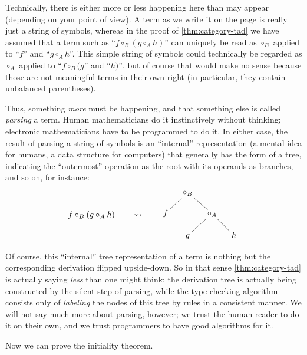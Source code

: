 \documentclass{book}
\def\comp#1{\circ_{#1}}
\begin{document}
\begin{rmk}
  Technically, there is either more or less happening here than may appear (depending on your point of view).
  A term as we write it on the page is really just a string of symbols, whereas in the proof of \cref{thm:category-tad} we have assumed that a term such as ``$f\comp{B} (g\comp{A} h)$'' can uniquely be read as $\comp{B}$ applied to ``$f$'' and ``$g\comp{A} h$''.
  This simple string of symbols could technically be regarded as $\comp{A}$ applied to ``$f\comp{B} (g$'' and ``$h)$'', but of course that would make no sense because those are not meaningful terms in their own right (in particular, they contain unbalanced parentheses).

  Thus, something \emph{more} must be happening, and that something else is called \emph{parsing} a term.
  Human mathematicians do it instinctively without thinking; electronic mathematicians have to be programmed to do it.
  In either case, the result of parsing a string of symbols is an ``internal'' representation (a mental idea for humans, a data structure for computers) that generally has the form of a tree, indicating the ``outermost'' operation as the root with its operands as branches, and so on, for instance:
  \[ f\comp{B} (g\comp{A} h) \qquad\leadsto\qquad \vcenter{\xymatrix@-1pc{ & \comp{B} \ar@{-}[dl] \ar@{-}[dr]\\
      f && \comp{A} \ar@{-}[dl]\ar@{-}[dr]\\
      & g && h }} \]

  Of course, this ``internal'' tree representation of a term is nothing but the corresponding derivation flipped upside-down.
  So in that sense \cref{thm:category-tad} is actually saying \emph{less} than one might think: the derivation tree is actually being constructed by the silent step of parsing, while the type-checking algorithm consists only of \emph{labeling} the nodes of this tree by rules in a consistent manner.
  We will not say much more about parsing, however;
  we trust the human reader to do it on their own, and we trust programmers to have good algorithms for it.
\end{rmk}

Now we can prove the initiality theorem.
\end{document}
